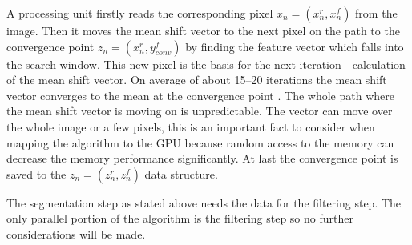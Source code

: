A processing unit firstly reads the corresponding pixel $x_n = (x_n^r, x_n^f)$
from the image. Then it moves the mean shift vector to the next pixel on the
path to the convergence point $z_n = (x_n^r, y_{conv}^f)$ by finding the feature
vector which falls into the search window. This new pixel is the basis for the
next iteration---calculation of the mean shift vector. On average of about
15--20 iterations the mean shift vector converges to the mean at the convergence
point \citep{DBLP:conf/eccv/ZhangKT06}. The whole path where the mean shift
vector is moving on is unpredictable. The vector can move over the whole image
or a few pixels, this is an important fact to consider when mapping the
algorithm to the \gls{GPU} because random access to the memory can decrease the
memory performance significantly. At last the convergence point is saved to the
$z_n = (z_n^r, z_n^f)$ data structure.

The segmentation step as stated above needs the data for the filtering step. The
only parallel portion of the algorithm is the filtering step so no further 
considerations will be made. 




























